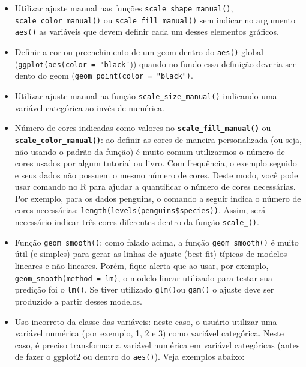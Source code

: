 \documentclass[
]{book}
\begin{document}
\begin{itemize}
\item
  Utilizar ajuste manual nas funções \texttt{scale\_shape\_manual()}, \texttt{scale\_color\_manual()} ou \texttt{scale\_fill\_manual()} sem indicar no argumento \texttt{aes()} as variáveis que devem definir cada um desses elementos gráficos.
\item
  Definir a cor ou preenchimento de um geom dentro do \texttt{aes()} global (\texttt{ggplot(aes(color\ =\ "black¨})) quando no fundo essa definição deveria ser dento do geom (\texttt{geom\_point(color\ =\ "black")}.
\item
  Utilizar ajuste manual na função \texttt{scale\_size\_manual()} indicando uma variável categórica ao invés de numérica.
\item
  Número de cores indicadas como valores no \textbf{\texttt{scale\_fill\_manual()}} ou \textbf{\texttt{scale\_color\_manual()}}: ao definir as cores de maneira personalizada (ou seja, não usando o padrão da função) é muito comum utilizarmos o número de cores usados por algum tutorial ou livro. Com frequência, o exemplo seguido e seus dados não possuem o mesmo número de cores. Deste modo, você pode usar comando no R para ajudar a quantificar o número de cores necessárias. Por exemplo, para os dados penguins, o comando a seguir indica o número de cores necessárias: \texttt{length(levels(penguins\$species))}. Assim, será necessário indicar três cores diferentes dentro da função \texttt{scale\_()}.
\item
  Função \texttt{geom\_smooth()}: como falado acima, a função \texttt{geom\_smooth()} é muito útil (e simples) para gerar as linhas de ajuste (best fit) típicas de modelos lineares e não lineares. Porém, fique alerta que ao usar, por exemplo, \texttt{geom\_smooth(method\ =\ lm)}, o modelo linear utilizado para testar sua predição foi o \texttt{lm()}. Se tiver utilizado \texttt{glm()}ou \texttt{gam()} o ajuste deve ser produzido a partir desses modelos.
\item
  Uso incorreto da classe das variáveis: neste caso, o usuário utilizar uma variável numérica (por exemplo, 1, 2 e 3) como variável categórica. Neste caso, é preciso transformar a variável numérica em variável categóricas (antes de fazer o ggplot2 ou dentro do \texttt{aes()}). Veja exemplos abaixo:
\end{itemize}
\end{document}
